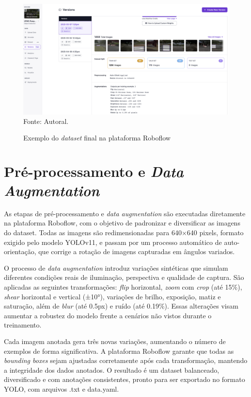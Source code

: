 \begin{figure}[htbp]
  \centering
  \caption{Exemplo do \textit{dataset} final na plataforma Roboflow}
  \includegraphics[width=1 \textwidth]{Figuras/dataset_roboflow.png}
  \\
  Fonte: Autoral.
  \label{fg-dataset-roboflow}
\end{figure}

\section{Pré-processamento e \textit{Data Augmentation}}

As etapas de pré-processamento e \textit{data augmentation} são executadas diretamente na plataforma Roboflow, com o objetivo de padronizar e diversificar as imagens do dataset. Todas as imagens são redimensionadas para 640×640 pixels, formato exigido pelo modelo YOLOv11, e passam por um processo automático de auto-orientação, que corrige a rotação de imagens capturadas em ângulos variados.

O processo de \textit{data augmentation} introduz variações sintéticas que simulam diferentes condições reais de iluminação, perspectiva e qualidade de captura. São aplicadas as seguintes transformações: \textit{flip} horizontal, \textit{zoom} com \textit{crop} (até 15\%), \textit{shear} horizontal e vertical (±10°), variações de brilho, exposição, matiz e saturação, além de \textit{blur} (até 0.5px) e ruído (até 0.19\%). Essas alterações visam aumentar a robustez do modelo frente a cenários não vistos durante o treinamento.

Cada imagem anotada gera três novas variações, aumentando o número de exemplos de forma significativa. A plataforma Roboflow garante que todas as \textit{bounding boxes} sejam ajustadas corretamente após cada transformação, mantendo a integridade dos dados anotados. O resultado é um dataset balanceado, diversificado e com anotações consistentes, pronto para ser exportado no formato YOLO, com arquivos .txt e data.yaml.

